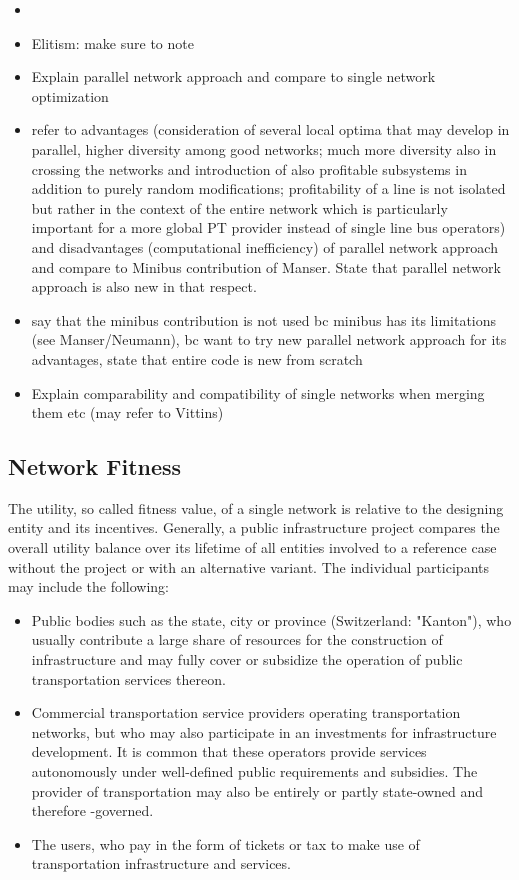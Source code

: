\begin{itemize}
	\item 
	\item Elitism: make sure to note
	\item Explain parallel network approach and compare to single network optimization
	\item refer to advantages (consideration of several local optima that may develop in parallel, higher diversity among good networks; much more diversity also in crossing the networks and introduction of also profitable subsystems in addition to purely random modifications; profitability of a line is not isolated but rather in the context of the entire network which is particularly important for a more global PT provider instead of single line bus operators) and disadvantages (computational inefficiency) of parallel network approach and compare to Minibus contribution of Manser. State that parallel network approach is also new in that respect.
	\item say that the minibus contribution is not used bc minibus has its limitations (see Manser/Neumann), bc want to try new parallel network approach for its advantages, state that entire code is new from scratch
	\item Explain comparability and compatibility of single networks when merging them etc (may refer to Vittins)
\end{itemize}

\subsection{Network Fitness}
The utility, so called fitness value, of a single network is relative to the designing entity and its incentives. Generally, a public infrastructure project compares the overall utility balance over its lifetime of all entities involved to a reference case without the project or with an alternative variant. The individual participants may include the following:

\begin{itemize}
	\item Public bodies such as the state, city or province (Switzerland: "Kanton"), who usually contribute a large share of resources for the construction of infrastructure and may fully cover or subsidize the operation of public transportation services thereon.
	\item Commercial transportation service providers operating transportation networks, but who may also participate in an investments for infrastructure development. It is common that these operators provide services autonomously under well-defined public requirements and subsidies. The provider of transportation may also be entirely or partly state-owned and therefore -governed.
	\item The users, who pay in the form of tickets or tax to make use of transportation infrastructure and services.
\end{itemize}

